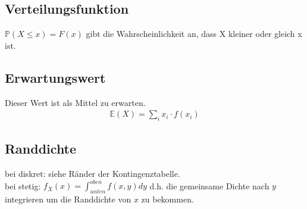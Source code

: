 \documentclass[a4paper, twocolumn]{article}
\begin{document}
	\subsection{Verteilungsfunktion} $ \mathbb{P}(X \le x) = F(x) $ gibt die Wahrscheinlichkeit an, dass X kleiner oder gleich x ist.
	
	\subsection{Erwartungswert}
	Dieser Wert ist als Mittel zu erwarten.
	\begin{gather*}
		\mathbb{E}(X) = \sum_i x_i \cdot f(x_i)
	\end{gather*}
	
	\subsection{Randdichte}
	bei diskret: siehe Ränder der Kontingenztabelle. \\
	bei stetig: $ f_X(x) = \int_{unten}^{oben} f(x,y) dy $ d.h. die gemeinsame Dichte nach $y$ integrieren um die Randdichte von $x$ zu bekommen.
	
\end{document}
